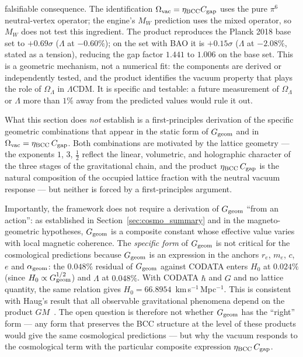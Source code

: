 \documentclass[10pt,a4paper]{article}
\begin{document}
\begin{enumerate}
{		falsifiable consequence.} The identification
	\(\Omega_{\rm vac} = \eta_{\rm BCC} C_{\rm gap}\) uses the pure
	$\pi^6$ neutral-vertex operator; the engine's \(M_W\) prediction uses
	the mixed operator, so \(M_W\) does not test this ingredient.
	The product reproduces the Planck 2018 base set to $+0.69\sigma$
	(\(\Lambda\) at $-0.60\%$); on the set with BAO it is $+0.15\sigma$
	(\(\Lambda\) at $-2.08\%$, stated as a tension), reducing the gap factor
	\(1.441\) to \(1.006\) on the base set. This is a geometric mechanism, not a
	numerical fit: the components are derived or independently
	tested, and the product identifies the vacuum property that
	plays the role of \(\Omega_\Lambda\) in \(\Lambda\)CDM. It is
	specific and testable: a future measurement of
	\(\Omega_\Lambda\) or \(\Lambda\) more than \(1\%\) away from
	the predicted values would rule it out.
\end{enumerate}

What this section does \emph{not} establish is a first-principles
derivation of the specific geometric combinations that appear in the
static form of \(G_{\rm geom}\) and in
\(\Omega_{\rm vac} = \eta_{\rm BCC}\,C_{\rm gap}\). Both combinations
are motivated by the lattice geometry — the exponents \(1\), \(3\),
\(\tfrac12\) reflect the linear, volumetric, and holographic character
of the three stages of the gravitational chain, and the product
\(\eta_{\rm BCC}\,C_{\rm gap}\) is the natural composition of the
occupied lattice fraction with the neutral vacuum response — but
neither is forced by a first-principles argument. 

Importantly, the framework does not require a derivation of
\(G_{\rm geom}\) ``from an action'': as established in
Section~\ref{sec:cosmo_summary} and in the magneto-geometric
hypotheses, \(G_{\rm geom}\) is a composite constant whose effective
value varies with local magnetic coherence. The \emph{specific form}
of \(G_{\rm geom}\) is not critical for the cosmological predictions
because \(G_{\rm geom}\) is an expression in the anchors $r_e$, $m_e$, $c$, $e$
and $\alpha_{\rm geom}$: the $0.048\%$ residual of \(G_{\rm geom}\) against
CODATA enters \(H_0\) at $0.024\%$ (since \(H_0 \propto G_{\rm geom}^{1/2}\))
and \(\Lambda\) at $0.048\%$. With CODATA \(\hbar\) and \(G\) and no lattice
quantity, the same relation gives $H_0 = 66.8954$~km\,s$^{-1}$\,Mpc$^{-1}$.
This is consistent with Haug's result that all
observable gravitational phenomena depend on the product
\(GM\)~\cite{Haug2020PhysicsEssays,Haug2022Universe,Haug2023JAMP}.
The open question is therefore not whether \(G_{\rm geom}\) has the
``right'' form --- any form that preserves the BCC structure at the
level of these products would give the same cosmological
predictions --- but why the vacuum responds to the cosmological term
with the particular composite expression \(\eta_{\rm BCC}\,C_{\rm gap}\).
\end{document}
